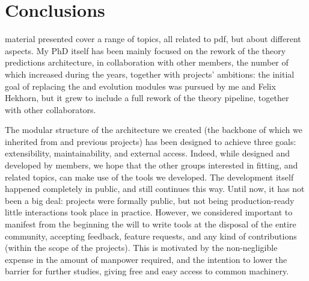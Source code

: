 
\cleardoublepage
{}

\chapter*{Conclusions}
%
	{}

 material presented cover a range of topics, all related to
\acrlong{pdf}, but about different aspects.
%
My PhD itself has been mainly focused on the rework of the theory predictions
architecture, in collaboration with other \nnpdf members, the number of which
increased during the years, together with projects' ambitions: the initial goal
of replacing the \dis and \dglap evolution modules was pursued by me and Felix
Hekhorn, but it grew to include a full rework of the theory pipeline, together
with other collaborators.

The modular structure of the architecture we created (the backbone of which we
inherited from \apfelcomb and previous \nnpdf projects) has been designed to
achieve three goals: extensibility, maintainability, and external access.
Indeed, while designed and developed by \nnpdf members, we hope that the other
groups interested in \pdf fitting, and related topics, can make use of the
tools we developed.
%
The development itself happened completely in public, and still continues this
way.
Until now, it has not been a big deal: projects were formally public, but not
being production-ready little interactions took place in practice.
However, we considered important to manifest from the beginning the will to
write tools at the disposal of the entire community, accepting feedback,
feature requests, and any kind of contributions (within the scope of the
projects).
%
This is motivated by the non-negligible expense in the amount of manpower
required, and the intention to lower the barrier for further studies, giving
free and easy access to common machinery.

